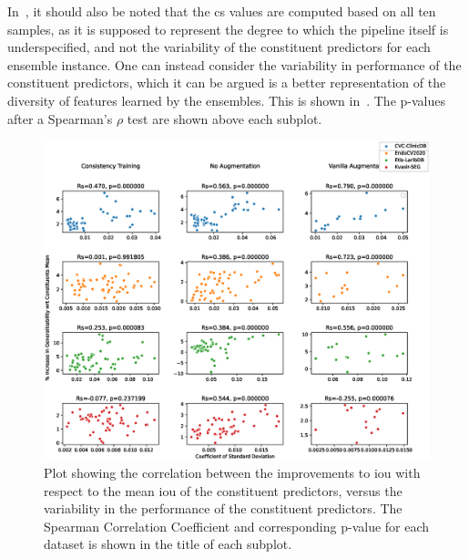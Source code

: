 In~, it should also be noted that the \gls{cs} values are computed based on all ten samples, as it is supposed to represent the degree to which the pipeline itself is underspecified, and not the variability of the constituent predictors for each ensemble instance. One can instead consider the variability in performance of the constituent predictors, which it can be argued is a better representation of the diversity of features learned by the ensembles. This is shown in~. The p-values after a Spearman's \(\rho\) test are shown above each subplot. 

\begin{figure}[!hb]
    \centering
    \hspace*{-1.9cm}\includegraphics[width=1.2\linewidth]{illustrations/ensemble_variance_relationship_statistical.eps}
     \caption[Relationship between ensemble improvements and constituents' performance variability]{Plot showing the correlation between the improvements to \gls{iou} with respect to the mean \gls{iou} of the constituent predictors, versus the variability in the performance of the constituent predictors. The Spearman Correlation Coefficient and corresponding p-value for each dataset is shown in the title of each subplot.}
    \label{fig:ensemble_var_stat}
\end{figure}

